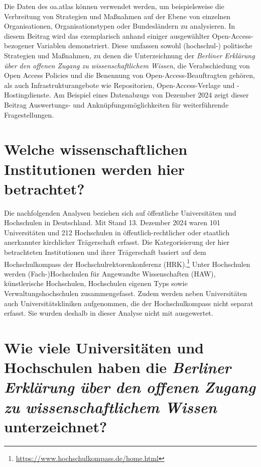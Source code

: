 \documentclass[a4paper,
fontsize=11pt,
oneside,
numbers=noperiodatend,
parskip=half-,
bibliography=totoc,
final
]{scrartcl}
\begin{document}
Die Daten des oa.atlas können verwendet werden, um beispielsweise die
Verbreitung von Strategien und Maßnahmen auf der Ebene von einzelnen
Organisationen, Organisationstypen oder Bundesländern zu analysieren. In
diesem Beitrag wird das exemplarisch anhand einiger ausgewählter
Open-Access-bezogener Variablen demonstriert. Diese umfassen sowohl
(hochschul-) politische Strategien und Maßnahmen, zu denen die
Unterzeichnung der \emph{Berliner Erklärung über den offenen Zugang zu
wissenschaftlichem Wissen}, die Verabschiedung von Open Access Policies
und die Benennung von Open-Access-Beauftragten gehören, als auch
Infrastrukturangebote wie Repositorien, Open-Access-Verlage und
-Hostingdienste. Am Beispiel eines Datenabzugs von Dezember 2024 zeigt
dieser Beitrag Auswertungs- und Anknüpfungsmöglichkeiten für
weiterführende Fragestellungen.

\section{Welche wissenschaftlichen Institutionen werden hier
betrachtet?}\label{welche-wissenschaftlichen-institutionen-werden-hier-betrachtet}

Die nachfolgenden Analysen beziehen sich auf öffentliche Universitäten
und Hochschulen in Deutschland. Mit Stand 13. Dezember 2024 waren 101
Universitäten und 212 Hochschulen in öffentlich-rechtlicher oder
staatlich anerkannter kirchlicher Trägerschaft erfasst. Die
Kategorisierung der hier betrachteten Institutionen und ihrer
Trägerschaft basiert auf dem Hochschulkompass der
Hochschulrektorenkonferenz (HRK).\footnote{\url{https://www.hochschulkompass.de/home.html}}
Unter Hochschulen werden (Fach-)Hochschulen für Angewandte
Wissenschaften (HAW), künstlerische Hochschulen, Hochschulen eigenen
Typs sowie Verwaltungshochschulen zusammengefasst. Zudem werden neben
Universitäten auch Universitätskliniken aufgenommen, die der
Hochschulkompass nicht separat erfasst. Sie wurden deshalb in dieser
Analyse nicht mit ausgewertet.

\section{\texorpdfstring{Wie viele Universitäten und Hochschulen
haben die \emph{Berliner Erklärung über den offenen Zugang zu
wissenschaftlichem Wissen}
unterzeichnet?}{Wie viele Universitäten und Hochschulen haben die Berliner Erklärung über den offenen Zugang zu wissenschaftlichem Wissen unterzeichnet?}}\label{wie-viele-universituxe4ten-und-hochschulen-haben-die-berliner-erkluxe4rung-uxfcber-den-offenen-zugang-zu-wissenschaftlichem-wissen-unterzeichnet}
\end{document}
